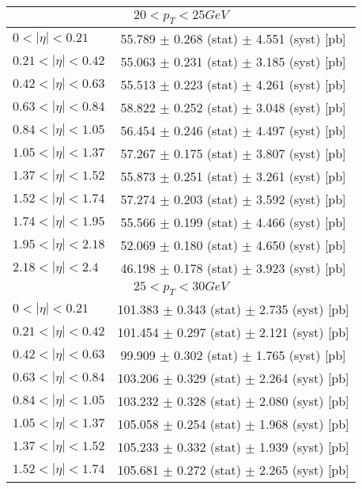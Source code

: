 \begin{tabular}{lc}
\hline
\hline
\multicolumn{2}{c}{$20 < p_{T} < 25 GeV$} \\
\hline
$0 < |\eta| <0.21$             & 55.789 $\pm$ 0.268 (stat) $\pm$ 4.551 (syst) [pb]  \\
$0.21 < |\eta| <0.42$          & 55.063 $\pm$ 0.231 (stat) $\pm$ 3.185 (syst) [pb]  \\
$0.42 < |\eta| <0.63$          & 55.513 $\pm$ 0.223 (stat) $\pm$ 4.261 (syst) [pb]  \\
$0.63 < |\eta| <0.84$          & 58.822 $\pm$ 0.252 (stat) $\pm$ 3.048 (syst) [pb]  \\
$0.84 < |\eta| <1.05$          & 56.454 $\pm$ 0.246 (stat) $\pm$ 4.497 (syst) [pb]  \\
$1.05 < |\eta| <1.37$          & 57.267 $\pm$ 0.175 (stat) $\pm$ 3.807 (syst) [pb]  \\
$1.37 < |\eta| <1.52$          & 55.873 $\pm$ 0.251 (stat) $\pm$ 3.261 (syst) [pb]  \\
$1.52 < |\eta| <1.74$          & 57.274 $\pm$ 0.203 (stat) $\pm$ 3.592 (syst) [pb]  \\
$1.74 < |\eta| <1.95$          & 55.566 $\pm$ 0.199 (stat) $\pm$ 4.466 (syst) [pb]  \\
$1.95 < |\eta| <2.18$          & 52.069 $\pm$ 0.180 (stat) $\pm$ 4.650 (syst) [pb]  \\
$2.18 < |\eta| <2.4$           & 46.198 $\pm$ 0.178 (stat) $\pm$ 3.923 (syst) [pb]  \\
\hline
\multicolumn{2}{c}{$25 < p_{T} < 30 GeV$} \\
\hline
$0 < |\eta| <0.21$             & 101.383 $\pm$ 0.343 (stat) $\pm$ 2.735 (syst) [pb]  \\
$0.21 < |\eta| <0.42$          & 101.454 $\pm$ 0.297 (stat) $\pm$ 2.121 (syst) [pb]  \\
$0.42 < |\eta| <0.63$          & 99.909 $\pm$ 0.302 (stat) $\pm$ 1.765 (syst) [pb]  \\
$0.63 < |\eta| <0.84$          & 103.206 $\pm$ 0.329 (stat) $\pm$ 2.264 (syst) [pb]  \\
$0.84 < |\eta| <1.05$          & 103.232 $\pm$ 0.328 (stat) $\pm$ 2.080 (syst) [pb]  \\
$1.05 < |\eta| <1.37$          & 105.058 $\pm$ 0.254 (stat) $\pm$ 1.968 (syst) [pb]  \\
$1.37 < |\eta| <1.52$          & 105.233 $\pm$ 0.332 (stat) $\pm$ 1.939 (syst) [pb]  \\
$1.52 < |\eta| <1.74$          & 105.681 $\pm$ 0.272 (stat) $\pm$ 2.265 (syst) [pb]  \\

\end{tabular}
